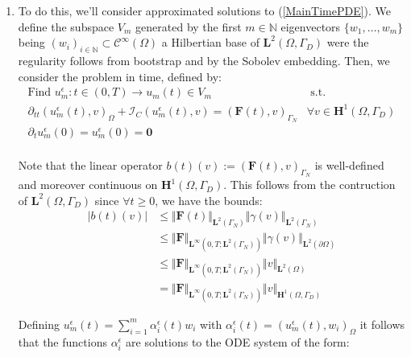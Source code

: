 \begin{enumerate}
    \item To do this, we'll consider approximated solutions to (\ref{MainTimePDE}). We define the subspace $V_m$ generated by the first $m \in \mathbb{N}$ eigenvectors $\{w_1, \dots, w_m \}$ being $(w_i)_{i \in \mathbb{N}} \subset \mathcal{C}^{\infty}(\Omega)$ a Hilbertian base of $\mathbf{L}^2(\Omega, \Gamma_D)$ were the regularity follows from bootstrap and by the Sobolev embedding.
    Then, we consider the problem in time, defined by:
    \begin{equation}
        \label{ApproxTimePDE}
        \begin{array}{cc}
            \text{Find } u^{\epsilon}_m: t \in (0,T) \longrightarrow u_m(t) \in V_m & \text{ s.t. } \\
            \partial_{tt}(u_m^{\epsilon}(t),v)_{\Omega} + \mathcal{I}_{C}(u^{\epsilon}_m(t),v) = (\mathbf{F}(t),v)_{\Gamma_N} & \forall v \in \mathbf{H}^1(\Omega,\Gamma_D) \\
            \partial_{t} u^{\epsilon}_m(0) = u^{\epsilon}_m(0) = \mathbf{0} & \\
        \end{array}
    \end{equation}
    \begin{rem}
    Note that the linear operator $b(t)(v) := (\mathbf{F}(t),v)_{\Gamma_N}$ is well-defined and moreover continuous on $\mathbf{H}^1(\Omega,\Gamma_D)$.
    This follows from the contruction of $\mathbf{L}^2(\Omega, \Gamma_D)$ since $\forall t \geq 0$, we have the bounds:
    \begin{align*}
        \vert b(t)(v) \vert & \leq \Vert \mathbf{F}(t) \Vert_{\mathbf{L}^2(\Gamma_N)} \Vert \gamma (v) \Vert_{\mathbf{L}^2(\Gamma_N)} \\
        & \leq \Vert \mathbf{F}\Vert_{\mathbf{L}^{\infty}(0,T;\mathbf{L}^2(\Gamma_N))} \Vert \gamma(v) \Vert_{\mathbf{L}^2(\partial \Omega)} \\
        & \leq \Vert \mathbf{F} \Vert_{\mathbf{L}^{\infty}(0,T;\mathbf{L}^2(\Gamma_N))} \Vert v \Vert_{\mathbf{L}^2(\Omega)}\\
        & = \Vert \mathbf{F}\Vert_{\mathbf{L}^{\infty}(0,T;\mathbf{L}^2(\Gamma_N))} \Vert v \Vert_{\mathbf{H}^1(\Omega, \Gamma_D)}
    \end{align*}
    \end{rem}
    Defining $u^{\epsilon}_m(t) = \sum_{i=1}^m \alpha_i^{\epsilon}(t) w_i$ with $\alpha_i^{\epsilon} (t) = (u^{\epsilon}_m(t),w_i)_{\Omega}$ it follows that the functions $\alpha_i^{\epsilon}$ are solutions to the ODE system of the form:

\end{enumerate}

